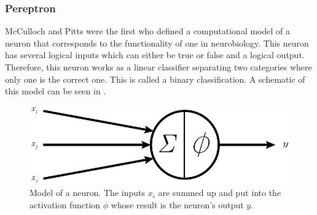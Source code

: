 \subsubsection{Pereptron}
\label{sec:mlp-theorie}
McCulloch and Pitts\cite{McCulloch1988} were the first who defined a computational model of a neuron that corresponds to the functionality of one in neurobiology.
This neuron has several logical inputs which can either be true or false and a logical output.
Therefore, this neuron works as a linear classifier separating two categories where only one is the correct one.
This is called a binary classification.
A schematic of this model can be seen in .
\begin{figure}
	\centering
	\includegraphics{images/neuron.pdf}
	\caption[Model of a Neuron]{Model of a neuron. The inputs $x_i$ are summed up and put into the activation function $\phi$ whose result is the neuron's output $y$.}
	\label{fig:neuron}
\end{figure}

